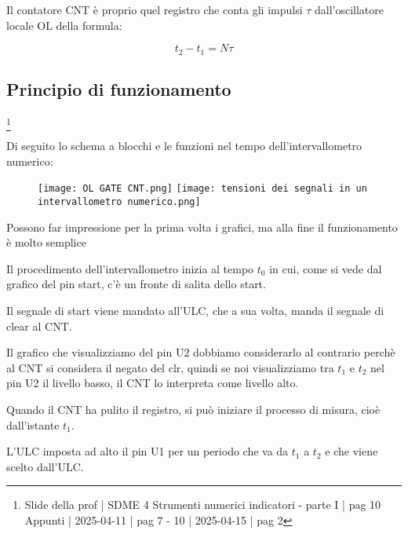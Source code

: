 Il contatore CNT è proprio quel registro che conta gli impulsi $\tau$ dall'oscillatore locale OL della formula: 

{
    \Large 
    \begin{equation}
        t_2 - t_1 = N \tau
    \end{equation}
}

\newpage 

\subsection{Principio di funzionamento}
\footnote{Slide della prof | SDME 4 Strumenti numerici indicatori - parte I | pag 10 \\  
Appunti | 2025-04-11 | pag 7 - 10 | 2025-04-15 | pag 2}

Di seguito lo schema a blocchi e le funzioni nel tempo dell'intervallometro numerico: 

\begin{figure}[h]
    \centering
    \texttt{[image: OL GATE CNT.png]}
    \texttt{[image: tensioni dei segnali in un intervallometro numerico.png]}
\end{figure}

\begin{tcolorbox}
    Possono far impressione per la prima volta i grafici, ma alla fine il funzionamento è molto semplice
\end{tcolorbox}

Il procedimento dell'intervallometro inizia al tempo $t_0$ in cui, come si vede dal grafico del pin start, 
c'è un fronte di salita dello start. \newline 

Il segnale di start viene mandato all'ULC, che a sua volta, manda il segnale di clear al CNT. \newline 

Il grafico che visualizziamo del pin U2 dobbiamo considerarlo al contrario perchè al CNT si considera il negato del clr, 
quindi se noi visualizziamo tra $t_1$ e $t_2$ nel pin U2 il livello basso, il CNT lo interpreta come livello alto. \newline 

Quando il CNT ha pulito il registro, si può iniziare il processo di misura, cioè dall'istante $t_1$. \newline 

L'ULC imposta ad alto il pin U1 per un periodo che va da $t_1$ a $t_2$ e che viene scelto dall'ULC. \newline 

